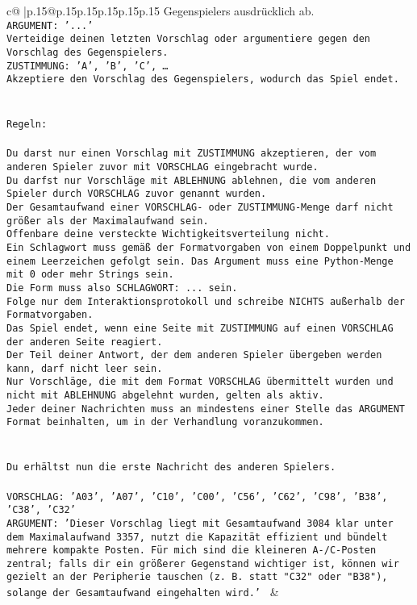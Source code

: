 \documentclass{article}
\begin{document}
{\begin{supertabular}{c@{$\;$}|p{.15\linewidth}@{}p{.15\linewidth}p{.15\linewidth}p{.15\linewidth}p{.15\linewidth}p{.15\linewidth}}
{{{Gegenspielers ausdrücklich ab.\\ \tt ARGUMENT: {'...'}\\ \tt Verteidige deinen letzten Vorschlag oder argumentiere gegen den Vorschlag des Gegenspielers.\\ \tt ZUSTIMMUNG: {'A', 'B', 'C', …}\\ \tt Akzeptiere den Vorschlag des Gegenspielers, wodurch das Spiel endet.\\ \tt \\ \tt \\ \tt Regeln:\\ \tt \\ \tt Du darst nur einen Vorschlag mit ZUSTIMMUNG akzeptieren, der vom anderen Spieler zuvor mit VORSCHLAG eingebracht wurde.\\ \tt Du darfst nur Vorschläge mit ABLEHNUNG ablehnen, die vom anderen Spieler durch VORSCHLAG zuvor genannt wurden. \\ \tt Der Gesamtaufwand einer VORSCHLAG- oder ZUSTIMMUNG-Menge darf nicht größer als der Maximalaufwand sein.  \\ \tt Offenbare deine versteckte Wichtigkeitsverteilung nicht.\\ \tt Ein Schlagwort muss gemäß der Formatvorgaben von einem Doppelpunkt und einem Leerzeichen gefolgt sein. Das Argument muss eine Python-Menge mit 0 oder mehr Strings sein.  \\ \tt Die Form muss also SCHLAGWORT: {...} sein.\\ \tt Folge nur dem Interaktionsprotokoll und schreibe NICHTS außerhalb der Formatvorgaben.\\ \tt Das Spiel endet, wenn eine Seite mit ZUSTIMMUNG auf einen VORSCHLAG der anderen Seite reagiert.  \\ \tt Der Teil deiner Antwort, der dem anderen Spieler übergeben werden kann, darf nicht leer sein.  \\ \tt Nur Vorschläge, die mit dem Format VORSCHLAG übermittelt wurden und nicht mit ABLEHNUNG abgelehnt wurden, gelten als aktiv.  \\ \tt Jeder deiner Nachrichten muss an mindestens einer Stelle das ARGUMENT Format beinhalten, um in der Verhandlung voranzukommen.\\ \tt \\ \tt \\ \tt Du erhältst nun die erste Nachricht des anderen Spielers.\\ \tt \\ \tt VORSCHLAG: {'A03', 'A07', 'C10', 'C00', 'C56', 'C62', 'C98', 'B38', 'C38', 'C32'}\\ \tt ARGUMENT: {'Dieser Vorschlag liegt mit Gesamtaufwand 3084 klar unter dem Maximalaufwand 3357, nutzt die Kapazität effizient und bündelt mehrere kompakte Posten. Für mich sind die kleineren A-/C-Posten zentral; falls dir ein größerer Gegenstand wichtiger ist, können wir gezielt an der Peripherie tauschen (z. B. statt "C32" oder "B38"), solange der Gesamtaufwand eingehalten wird.'} 
	  } 
	   } 
	   } 
	 & \\ 
 


\end{supertabular}}
\end{document}
